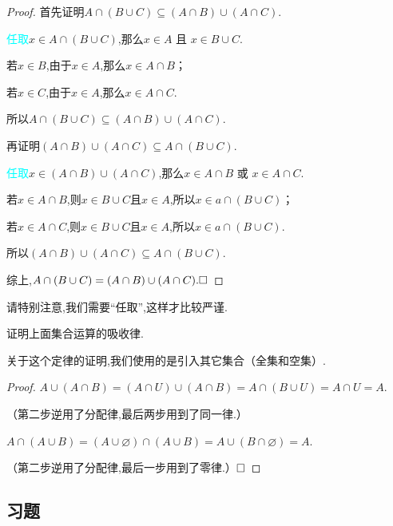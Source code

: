 \documentclass[lang=cn,math=cm,chinesefont=nofont,11pt,scheme=chinese,twocol]{elegantbook}
\begin{document}
\begin{proof}
  首先证明$A\cap(B\cup C)\subseteq(A\cap B)\cup(A\cap C)$.

  \textcolor{cyan}{任取}\enspace$x\in A\cap(B\cup C)$,那么$x\in A\text{ 且 }x\in B\cup C$.

  若$x\in B$,由于$x\in A$,那么$x\in A\cap B$；

  若$x\in C$,由于$x\in A$,那么$x\in A\cap C$.

  所以$A\cap(B\cup C)\subseteq(A\cap B)\cup(A\cap C)$.

  \hspace*{\fill}

  再证明$(A\cap B)\cup(A\cap C)\subseteq A\cap(B\cup C)$.

  \textcolor{cyan}{任取}\enspace$x\in (A\cap B)\cup(A\cap C)$,那么$x\in A\cap B\text{ 或 }x\in A\cap C$.

  若$x\in A\cap B$,则$x\in B\cup C\text{且}x\in A$,所以$x\in a\cap(B\cup C)$；

  若$x\in A\cap C$,则$x\in B\cup C\text{且}x\in A$,所以$x\in a\cap(B\cup C)$.

  所以$(A\cap B)\cup(A\cap C)\subseteq A\cap(B\cup C)$.

  综上,$A\cap(B\cup C)=(A\cap B)\cup(A\cap C).\hfill\square$
\end{proof}
\begin{remark}
  请特别注意,我们需要“任取”,这样才比较严谨.
\end{remark}

\hspace*{\fill}

\begin{example}
  证明上面集合运算的吸收律.
\end{example}
关于这个定律的证明,我们使用的是引入其它集合（全集和空集）.

\begin{proof}
  $A\cup (A\cap B)=(A\cap U)\cup(A\cap B)=A\cap(B\cup U)=A\cap U=A.$

  （第二步逆用了分配律,最后两步用到了同一律.）

  $A\cap(A\cup B)=(A\cup\varnothing)\cap(A\cup B)=A\cup(B\cap\varnothing)=A.$

  （第二步逆用了分配律,最后一步用到了零律.）$\hfill\square$
\end{proof}

\subsection{习题}
\end{document}
